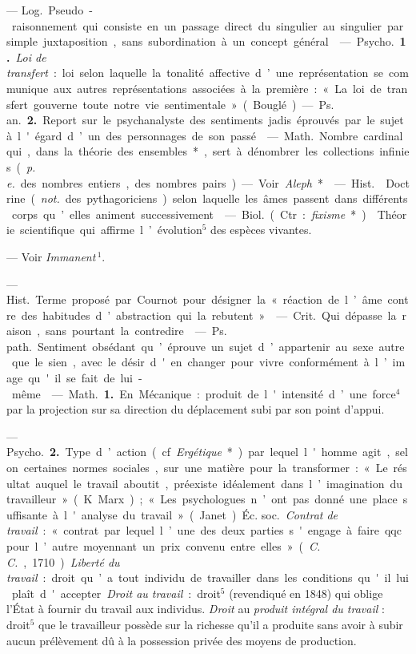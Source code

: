\begin{itemize}[leftmargin=1cm, label=, itemsep=1pt]
 — \si{Log.} Pseudo-raisonnement qui consiste en un passage
direct du singulier au singulier par simple juxtaposition, sans subordination
à un concept général.

 — \si{Psycho.} {\bf 1.} {\it Loi de transfert} : loi selon
laquelle la tonalité affective d’une représentation se communique aux autres
représentations associées à la première : « La loi de transfert gouverne
toute notre vie sentimentale » (Bouglé). — \si{Ps. an.} {\bf 2.} Report sur
le psychanalyste des sentiments jadis éprouvés par le sujet à l'égard d’un
des personnages de son passé.

 — \si{Math.} Nombre cardinal qui, dans la théorie des
ensembles*, sert à dénombrer les collections infinies ({\it p. e.} des
nombres entiers, des nombres pairs). — Voir {\it Aleph}*.

 — \si{Hist.}  Doctrine
({\it not.} des pythagoriciens) selon laquelle les âmes passent dans
différents corps qu’elles animent successivement.

 — \si{Biol.} (Ctr. : {\it fixisme}*). 
Théorie scientifique qui affirme l’évolution$^5$ des espèces vivantes.

 — Voir {\it Immanent}$\,^1$.

 — \si{Hist.} Terme proposé par Cournot pour désigner
la « réaction de l’âme contre des habitudes d’abstraction qui la rebutent ».

 — \si{Crit.} Qui dépasse
la raison, sans pourtant la contredire.

 — \si{Ps. path.} Sentiment obsédant qu’éprouve un sujet
d’appartenir au sexe autre que le sien, avec le désir d'en changer pour vivre
conformément à l’image qu'il se fait de lui-même.

 — \si{Math.} {\bf 1.} En Mécanique : produit de l'intensité
d’une force$^4$ par la projection sur sa direction du déplacement subi par
son point d'appui.

— \si{Psycho.} {\bf 2.} Type d’action (cf. {\it Ergétique}*) par lequel
l'homme agit, selon certaines normes sociales, sur une matière pour la
transformer : « Le résultat auquel le travail aboutit, préexiste idéalement
dans l’imagination du travailleur » (K. Marx) ; « Les psychologues n’ont pas
donné une place suffisante à l'analyse du travail » (Janet). \si{Éc. soc.}
{\it Contrat de travail} : « contrat par lequel l’une des deux parties
s'engage à faire qqc. pour l’autre moyennant un prix convenu entre elles
» ({\it C. C.}, 1710). {\it Liberté du travail} : droit qu’a tout individu de
travailler dans les conditions qu'il lui plaît d'accepter. {\it Droit au
travail} : droit$^5$ (revendiqué en 1848) qui oblige l'État à fournir du
travail aux individus. {\it Droit} au {\it produit intégral du travail} :
droit$^5$
que le travailleur possède sur la richesse qu’il a produite sans avoir à
subir aucun prélèvement dû à la possession privée des moyens de production.


\end{itemize}
